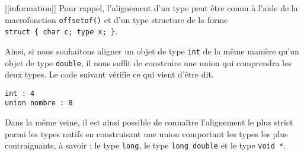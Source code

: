 \documentclass[]{article}
\newenvironment{Shaded}{}{}
\newcommand{\KeywordTok}[1]{\textcolor[rgb]{0.00,0.44,0.13}{\textbf{{#1}}}}
\newcommand{\DataTypeTok}[1]{\textcolor[rgb]{0.56,0.13,0.00}{{#1}}}
\newcommand{\DecValTok}[1]{\textcolor[rgb]{0.25,0.63,0.44}{{#1}}}
\newcommand{\SpecialCharTok}[1]{\textcolor[rgb]{0.25,0.44,0.63}{{#1}}}
\newcommand{\StringTok}[1]{\textcolor[rgb]{0.25,0.44,0.63}{{#1}}}
\newcommand{\ImportTok}[1]{{#1}}
\newcommand{\ControlFlowTok}[1]{\textcolor[rgb]{0.00,0.44,0.13}{\textbf{{#1}}}}
\newcommand{\PreprocessorTok}[1]{\textcolor[rgb]{0.74,0.48,0.00}{{#1}}}
\newcommand{\NormalTok}[1]{{#1}}
\begin{document}
{[}{[}information{]}{]} \textbar{} Pour rappel, l'alignement d'un type
peut être connu à l'aide de la macrofonction \texttt{offsetof()} et d'un
type structure de la forme \texttt{struct\ \{\ char\ c;\ type\ x;\ \}}.

Ainsi, si nous souhaitons aligner un objet de type \texttt{int} de la
même manière qu'un objet de type \texttt{double}, il nous suffit de
construire une union qui comprendra les deux types. Le code suivant
vérifie ce qui vient d'être dit.

\begin{Shaded}
\end{Shaded}

\begin{verbatim}
int : 4
union nombre : 8
\end{verbatim}

Dans la même veine, il est ainsi possible de connaître l'alignement le
plus strict parmi les types natifs en construisant une union comportant
les types les plus contraignants, à savoir : le type \texttt{long}, le
type \texttt{long\ double} et le type \texttt{void\ *}.
\end{document}
